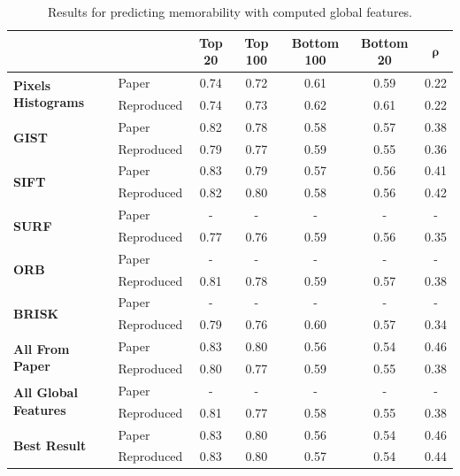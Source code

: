 \documentclass[10pt,twocolumn,letterpaper]{article}
\begin{document}
\begingroup
\setlength{\tabcolsep}{5pt}
\renewcommand{\arraystretch}{1.5}
\begin{table}[ht]
    \centering
    \begin{tabular}{|l||l|c|c|c|c|c|} \hline
         & & \textbf{Top 20} & \textbf{Top 100} & \textbf{Bottom 100} & \textbf{Bottom 20} & $\bm{\rho}$\\ \hline \hline
        \multirow{2}{*}{\textbf{Pixels Histograms}} & Paper & 0.74 & 0.72 & 0.61 & 0.59 & 0.22\\ \cline{2-7}
         & Reproduced & 0.74 & 0.73 & 0.62 & 0.61 & 0.22\\ \hline \hline
        \multirow{2}{*}{\textbf{GIST}} & Paper & 0.82 & 0.78 & 0.58 & 0.57 & 0.38\\ \cline{2-7}
         & Reproduced & 0.79 & 0.77 & 0.59 & 0.55 & 0.36\\ \hline \hline
        \multirow{2}{*}{\textbf{SIFT}} & Paper & 0.83 & 0.79 & 0.57 & 0.56 & 0.41\\ \cline{2-7}
         & Reproduced & 0.82 & 0.80 & 0.58 & 0.56 & 0.42\\ \hline \hline
        \multirow{2}{*}{\textbf{SURF}} & Paper & - & - & - & - & -\\ \cline{2-7}
         & Reproduced & 0.77 & 0.76 & 0.59 & 0.56 & 0.35\\ \hline \hline
        \multirow{2}{*}{\textbf{ORB}} & Paper & - & - & - & - & -\\ \cline{2-7}
         & Reproduced & 0.81 & 0.78 & 0.59 & 0.57 & 0.38\\ \hline \hline
        \multirow{2}{*}{\textbf{BRISK}} & Paper & - & - & - & - & -\\ \cline{2-7}
         & Reproduced & 0.79 & 0.76 & 0.60 & 0.57 & 0.34\\ \hline \hline
        \multirow{2}{*}{\textbf{All From Paper}} & Paper & 0.83 & 0.80 & 0.56 & 0.54 & 0.46\\ \cline{2-7}
         & Reproduced & 0.80 & 0.77 & 0.59 & 0.55 & 0.38\\ \hline \hline
        \multirow{2}{*}{\textbf{All Global Features}} & Paper & - & - & - & - & -\\ \cline{2-7}
         & Reproduced & 0.81 & 0.77 & 0.58 & 0.55 & 0.38\\ \hline \hline
        \multirow{2}{*}{\textbf{Best Result}} & Paper & 0.83 & 0.80 & 0.56 & 0.54 & 0.46\\ \cline{2-7}
         & Reproduced & 0.83 & 0.80 & 0.57 & 0.54 & 0.44\\ \hline
    \end{tabular}
    \caption{Results for predicting memorability with computed global features.}
    \label{tab:our_features}
\end{table}
\endgroup
\end{document}
